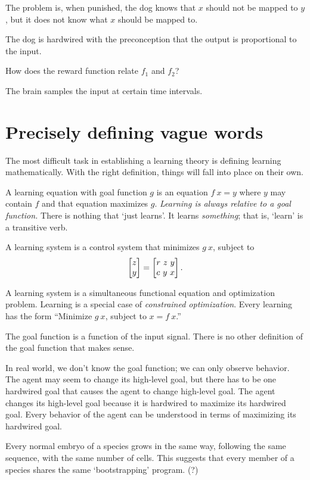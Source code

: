 The problem is, when punished, the dog knows that
\(x\) should not be mapped to \(y\),
but it does not know what \(x\) should be mapped to.

The dog is hardwired with the preconception that the output is proportional to the input.

How does the reward function relate \(f_1\) and \(f_2\)?

The brain samples the input at certain time intervals.

\section{Precisely defining vague words}

The most difficult task in establishing a learning theory is defining learning mathematically.
With the right definition, things will fall into place on their own.

A learning equation with goal function \(g\)
is an equation \( f~x = y \) where \( y \) may contain \( f \)
and that equation maximizes \( g \).
\emph{Learning is always relative to a goal function.}
There is nothing that `just learns'.
It learns \emph{something};
that is, `learn' is a transitive verb.

A learning system is a control system that minimizes \(g~x\), subject to
\[
    \begin{bmatrix}z \\ y\end{bmatrix} = \begin{bmatrix}r~z~y \\ c~y~x\end{bmatrix}.
\]

A learning system is a simultaneous functional equation and optimization problem.
Learning is a special case of \emph{constrained optimization}.
Every learning has the form ``Minimize \(g~x\), subject to \(x = f~x\).''

The goal function is a function of the input signal.
There is no other definition of the goal function that makes sense.

In real world, we don't know the goal function;
we can only observe behavior.
The agent may seem to change its high-level goal,
but there has to be one hardwired goal that causes the agent to change high-level goal.
The agent changes its high-level goal because it is hardwired to maximize its hardwired goal.
Every behavior of the agent can be understood in terms of maximizing its hardwired goal.

Every normal embryo of a species grows in the same way,
following the same sequence,
with the same number of cells.
This suggests that every member of a species
shares the same `bootstrapping' program. (?)

